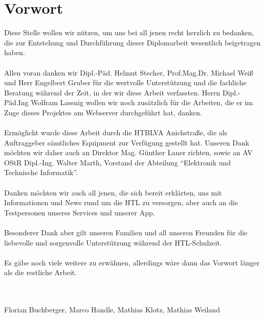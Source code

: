 \chapter{Vorwort}


Diese Stelle wollen wir nützen, um uns bei all jenen recht herzlich zu bedanken, die zur Entstehung und Durchführung dieser Diplomarbeit wesentlich beigetragen haben.\\
\\
Allen voran danken wir Dipl.-Päd. Helmut Stecher, Prof.Mag.Dr. Michael Weiß und Herr Engelbert Gruber für die wertvolle Unterstützung und die fachliche Beratung während der Zeit, in der wir diese Arbeit verfassten. Herrn Dipl.-Päd.Ing Wolfram Lassnig wollen wir noch zusätzlich für die Arbeiten, die er im Zuge dieses Projektes am Webserver durchgeführt hat, danken.\\
\\
Ermöglicht wurde diese Arbeit durch die HTBLVA Anichstraße, die als Auftraggeber sämtliches Equipment zur Verfügung gestellt hat. Unseren Dank möchten wir daher auch an Direktor Mag. Günther Laner richten, sowie an AV OStR Dipl.-Ing. Walter Marth, Vorstand der Abteilung \enquote{Elektronik und Technische Informatik}.\\
\\
Danken möchten wir auch all jenen, die sich bereit erklärten, uns mit Informationen und News rund um die HTL zu versorgen, aber auch an die Testpersonen unseres Services und unserer App.\\
\\
Besonderer Dank aber gilt unseren Familien und all unseren Freunden für die liebevolle und sorgenvolle Unterstützung während der HTL-Schulzeit.\\
\\
Es gäbe noch viele weitere zu erwähnen, allerdings wäre dann das Vorwort länger als die restliche Arbeit.\\
\\
\\
\begin{flushright}
Florian Buchberger, Marco Handle, Mathias Klotz, Mathias Weiland
\end{flushright}
